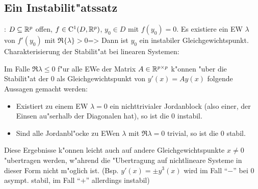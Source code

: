 \subsection{Ein Instabilit"atssatz}
\theorem:
  $D\subseteq\mathbb R^p$ offen, $f\in{\rm C}^1(D,\mathbb R^p)$, $y_0\in D$
  mit $f(y_0)=0$. Es existiere ein EW $\lambda$ von $f'(y_0)$ mit
  $\Re\{\lambda\}>0$=>{
  Dann ist $y_0$ ein instabiler Gleichgewichtspunkt.
  }
\remark Charakterisierung der Stabilit"at bei linearen Systemen:{
  Im Falle $\Re\lambda\leq 0$ f"ur alle EWe der Matrix $A\in\mathbb R^{p\times p}$
  k"onnen "uber die Stabilit"at der 0 als Gleichgewichtspunkt von $y'(x)=Ay(x)$
  folgende Aussagen gemacht werden:
  \begin{itemize}
    \item Existiert zu einem EW $\lambda=0$ ein nichttrivialer
      Jordanblock (also einer, der Einsen au"serhalb der Diagonalen hat),
      so ist die $0$ instabil.
    \item Sind alle Jordanbl"ocke zu EWen $\lambda$ mit $\Re\lambda=0$
      trivial, so ist die $0$ stabil.
    \end{itemize}
  Diese Ergebnisse k"onnen leicht auch auf andere Gleichgewichtspunkte $x\neq 0$
  "ubertragen werden, w"ahrend die "Ubertragung auf nichtlineare Systeme
  in dieser Form nicht m"oglich ist. (Bsp. $y'(x)=\pm y^3(x)$ wird
  im Fall ``$-$'' bei $0$ asympt. stabil, im Fall ``$+$'' allerdings instabil)
  }
